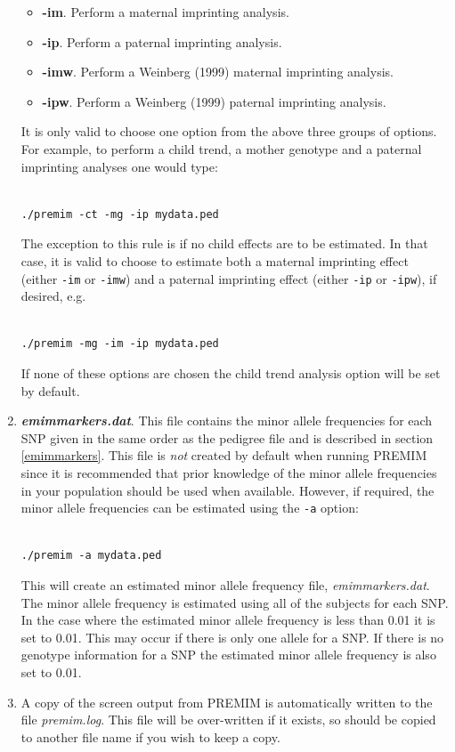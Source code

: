 \documentclass[a4paper,12pt]{article}
\newcommand{\code}[1]{{\footnotesize{{\tt #1}}}}
\begin{document}
\begin{enumerate}
\begin{itemize}
\item {\bf -im}. Perform a maternal imprinting analysis. 
\item {\bf -ip}. Perform a paternal imprinting analysis. 
\item {\bf -imw}. Perform a Weinberg (1999) maternal imprinting analysis. 
\item {\bf -ipw}. Perform a Weinberg (1999) paternal imprinting analysis.\end{itemize}
It is only valid to choose one option from the above three groups of options. For example, to perform a child trend, a mother genotype and a paternal imprinting analyses one would type: \vspace{0.35cm} \begin{lstlisting}

./premim -ct -mg -ip mydata.ped

\end{lstlisting} \vspace{0.35cm}The exception to this rule is if no child effects are to be estimated. In that case, it is valid to choose to estimate both a maternal imprinting effect (either \code{-im} or \code{-imw}) and a paternal imprinting effect (either \code{-ip} or \code{-ipw}), if desired, e.g. \vspace{0.35cm} \begin{lstlisting}

./premim -mg -im -ip mydata.ped

\end{lstlisting} \vspace{0.35cm}If none of these options are chosen the child trend analysis option will be set by default. 
\item {\bf {\it emimmarkers.dat}}. This file contains the minor allele frequencies for each SNP given in the same order as the pedigree file and is described in  section \ref{emimmarkers}. This file is {\it not} created by default when running PREMIM since it is recommended that prior knowledge of the minor allele frequencies in your population should be used when available. However, if required, the minor allele frequencies can be estimated using the \code{-a} option: \vspace{0.35cm} \begin{lstlisting}

./premim -a mydata.ped

\end{lstlisting} \vspace{0.35cm}This will create an estimated minor allele frequency file, {\it emimmarkers.dat}. The minor allele frequency is estimated using all of the subjects for each SNP. In the case where the estimated minor allele frequency is less than 0.01 it is set to 0.01. This may occur if there is only one allele for a SNP. If there is no genotype information for a SNP the estimated minor allele frequency is also set to 0.01. 
\item A copy of the screen output from PREMIM is automatically written to the file {\it premim.log}. This file will be over-written if it exists, so should be copied to another file name if you wish to keep a copy.\end{enumerate}
\end{document}
